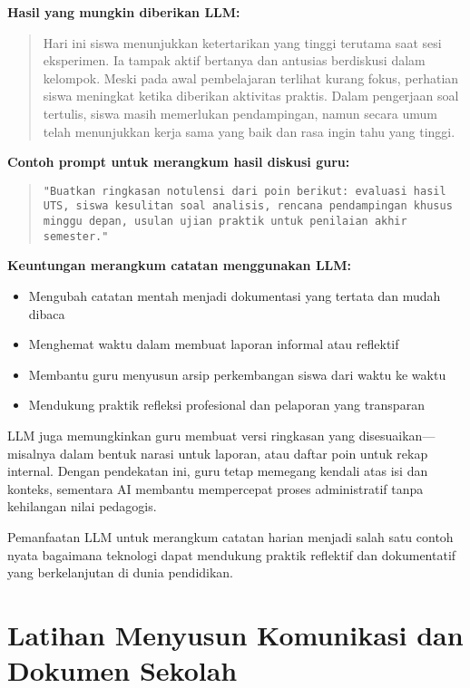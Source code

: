 \textbf{Hasil yang mungkin diberikan LLM:}

\begin{quote}
	Hari ini siswa menunjukkan ketertarikan yang tinggi terutama saat sesi eksperimen. Ia tampak aktif bertanya dan antusias berdiskusi dalam kelompok. Meski pada awal pembelajaran terlihat kurang fokus, perhatian siswa meningkat ketika diberikan aktivitas praktis. Dalam pengerjaan soal tertulis, siswa masih memerlukan pendampingan, namun secara umum telah menunjukkan kerja sama yang baik dan rasa ingin tahu yang tinggi.
\end{quote}

\textbf{Contoh prompt untuk merangkum hasil diskusi guru:}

\begin{quote}
	\centering
	\texttt{"Buatkan ringkasan notulensi dari poin berikut: evaluasi hasil UTS, siswa kesulitan soal analisis, rencana pendampingan khusus minggu depan, usulan ujian praktik untuk penilaian akhir semester."}
\end{quote}

\textbf{Keuntungan merangkum catatan menggunakan LLM:}
\begin{itemize}
	\item Mengubah catatan mentah menjadi dokumentasi yang tertata dan mudah dibaca
	\item Menghemat waktu dalam membuat laporan informal atau reflektif
	\item Membantu guru menyusun arsip perkembangan siswa dari waktu ke waktu
	\item Mendukung praktik refleksi profesional dan pelaporan yang transparan
\end{itemize}

LLM juga memungkinkan guru membuat versi ringkasan yang disesuaikan—misalnya dalam bentuk narasi untuk laporan, atau daftar poin untuk rekap internal. Dengan pendekatan ini, guru tetap memegang kendali atas isi dan konteks, sementara AI membantu mempercepat proses administratif tanpa kehilangan nilai pedagogis.

Pemanfaatan LLM untuk merangkum catatan harian menjadi salah satu contoh nyata bagaimana teknologi dapat mendukung praktik reflektif dan dokumentatif yang berkelanjutan di dunia pendidikan.


\section{Latihan Menyusun Komunikasi dan Dokumen Sekolah}

